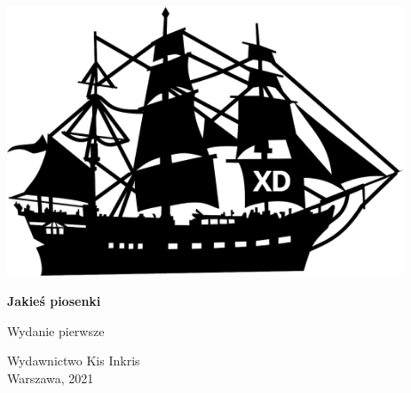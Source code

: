 \documentclass[11pt, twoside]{book}
\begin{document}
\begin{titlepage}
    \begin{center}
        \vspace*{5cm}
        
        \includegraphics[height=8cm]{images/front-obrazek.png}

        \vspace{1.5cm}

        \Huge\textbf{Jakieś piosenki}
        
        \vspace{0.5cm}
        
        \LARGE Wydanie pierwsze
        
        \vfill

        \Large
        Wydawnictwo Kis Inkris \\
        Warszawa, 2021



    \end{center}
\end{titlepage}
\end{document}
